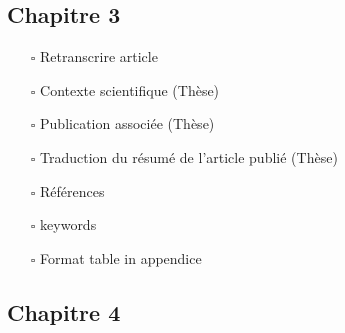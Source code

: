 \hypertarget{chapitre-3}{%
\subsection*{Chapitre 3}\label{chapitre-3}}

\begin{itemize}
\tightlist
\item[$\square$]
  Retranscrire article
\item[$\square$]
  Contexte scientifique (Thèse)
\item[$\square$]
  Publication associée (Thèse)
\item[$\square$]
  Traduction du résumé de l'article publié (Thèse)
\item[$\square$]
  Références
\item[$\square$]
  keywords
\item[$\square$]
  Format table in appendice
\end{itemize}

\hypertarget{chapitre-4}{%
\subsection*{Chapitre 4}\label{chapitre-4}}


